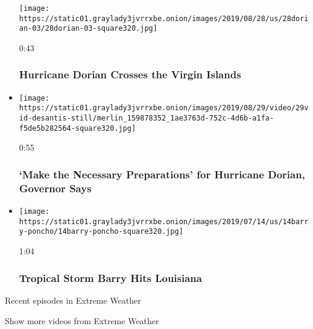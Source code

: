 \begin{itemize}
  \texttt{[image: https://static01.graylady3jvrrxbe.onion/images/2019/08/28/us/28dorian-03/28dorian-03-square320.jpg]}

  0:43

  \hypertarget{hurricane-dorian-crosses-the-virgin-islands}{%
  \subsubsection{Hurricane Dorian Crosses the Virgin
  Islands}\label{hurricane-dorian-crosses-the-virgin-islands}}
\item
  \href{https://www.nytimes3xbfgragh.onion/video/us/100000006688013/hurricane-dorian-preparations.html?action=click\&module=video-series-bar\&region=header\&pgtype=Article\&playlistId=video/extreme-weather}{}

  \texttt{[image: https://static01.graylady3jvrrxbe.onion/images/2019/08/29/video/29vid-desantis-still/merlin\_159878352\_1ae3763d-752c-4d6b-a1fa-f5de5b282564-square320.jpg]}

  0:55

  \hypertarget{make-the-necessary-preparations-for-hurricane-dorian-governor-says}{%
  \subsubsection{`Make the Necessary Preparations' for Hurricane Dorian,
  Governor
  Says}\label{make-the-necessary-preparations-for-hurricane-dorian-governor-says}}
\item
  \href{https://www.nytimes3xbfgragh.onion/video/us/100000006610272/hurricane-barry-video.html?action=click\&module=video-series-bar\&region=header\&pgtype=Article\&playlistId=video/extreme-weather}{}

  \texttt{[image: https://static01.graylady3jvrrxbe.onion/images/2019/07/14/us/14barry-poncho/14barry-poncho-square320.jpg]}

  1:04

  \hypertarget{tropical-storm-barry-hits-louisiana}{%
  \subsubsection{Tropical Storm Barry Hits
  Louisiana}\label{tropical-storm-barry-hits-louisiana}}
\end{itemize}

Recent episodes in Extreme Weather

Show more videos from Extreme Weather

\href{/video}{}


